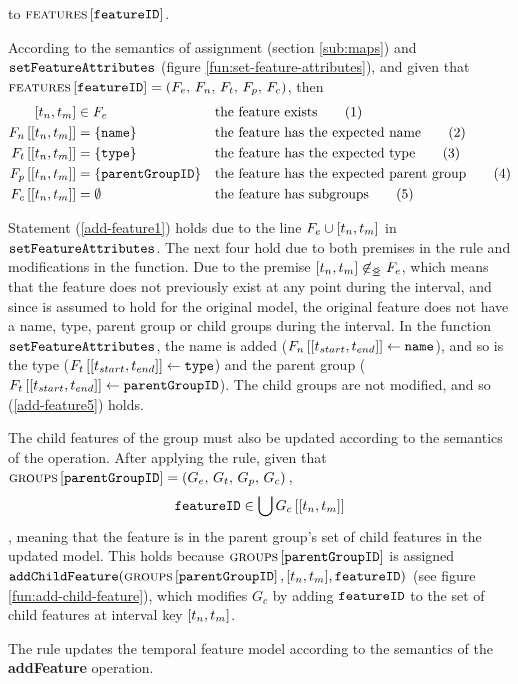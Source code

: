 to $\textsc{features} \left[ \texttt{featureID} \right]$. 

According to the semantics of assignment (section \vref{sub:maps}) and $\texttt{setFeatureAttributes}$ (figure \vref{fun:set-feature-attributes}), and given that $\textsc{features} \left[ \texttt{featureID} \right] = \left(F_e,\, F_n,\, F_t,\, F_p,\, F_c\right)$, then 
\begin{align}
   \interval{t_n}{t_m} &\in F_e && \text{the feature exists} \tag{1} \label{add-feature1}\\
   \lookup{F_n}{\interval{t_n}{t_m}} &= \set{\var{name}} && \text{the feature has the expected name} \tag{2} \label{add-feature2}\\
   \lookup{F_t}{\interval{t_n}{t_m}} &= \set{\var{type}}  && \text{the feature has the expected type} \tag{3} \label{add-feature3}\\
   \lookup{F_p}{\interval{t_n}{t_m}} &= \set{\var{parentGroupID}}  && \text{the feature has the expected parent group} \tag{4} \label{add-feature4}\\
   \lookup{F_c}{\interval{t_n}{t_m}} &= \emptyset && \text{the feature has subgroups} \tag{5} \label{add-feature5}
\end{align}

Statement (\ref{add-feature1}) holds due to the line $F_e \cup \interval{t_n}{t_m}$ in $\texttt{setFeatureAttributes}$. The next four hold due to both premises in the rule and modifications in the function. Due to the premise $\interval{t_n}{t_m} \not \innr F_e$, which means that the feature does not previously exist at any point during the interval, and since  is assumed to hold for the original model, the original feature does not have a name, type, parent group or child groups during the interval. In the function $\texttt{setFeatureAttributes}$, the name is added ($\lookup{F_n}{\interval{t_{start}}{t_{end}}} \assign \var{name}$), and so is the type ($\lookup{F_t}{\interval{t_{start}}{t_{end}}} \assign \var{type}$) and the parent group ($\lookup{F_t}{\interval{t_{start}}{t_{end}}} \assign \var{parentGroupID}$). The child groups are not modified, and so (\ref{add-feature5}) holds.

The child features of the group must also be updated according to the semantics of the operation. After applying the rule, given that $\textsc{groups}{} \left[ \texttt{parentGroupID} \right] = \left(G_e,\, G_t,\, G_p,\, G_c\right){}$, 
\[
   \var{featureID} \in \bigcup \lookup{G_c}{\interval{t_n}{t_m}}
\]
, meaning that the feature is in the parent group's set of child features in the updated model. This holds because $\textsc{groups}{} \left[ \texttt{parentGroupID} \right]$ is assigned $\var{addChildFeature}(\lookup{\groups}{\var{parentGroupID}}, \interval{t_n}{t_m}, \var{featureID})$ (see figure \vref{fun:add-child-feature}), which modifies $G_c$ by adding $\texttt{featureID}$ to the set of child features at interval key $\interval{t_n}{t_m}$.
\\

\begin{lemma}
   The  rule updates the temporal feature model according to the semantics of the \textbf{addFeature} operation.
   \label{lemma:add-feature-mod}
\end{lemma}

